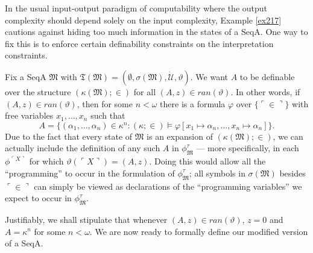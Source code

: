 \documentclass[12pt, twoside]{memoir}
\numberwithin{equation}{section}
\theoremstyle{definition}
\theoremstyle{remark}
\theoremstyle{definition}
\theoremstyle{definition}
\theoremstyle{definition}
\theoremstyle{remark}
\begin{document}
In the usual input-output paradigm of computability where the output complexity should depend solely on the input complexity, Example \ref{ex217} cautions against hiding too much information in the states of a SeqA. One way to fix this is to enforce certain definability constraints on the interpretation constraints. 

Fix a SeqA $\mathfrak{M}$ with $\mathfrak{T}(\mathfrak{M}) = (\emptyset, \sigma(\mathfrak{M}), \dot{\mathcal{U}}, \vartheta)$. We want $A$ to be definable over the structure $(\kappa(\mathfrak{M}); \in)$ for all $(A, z) \in ran(\vartheta)$. In other words, if $(A, z) \in ran(\vartheta)$, then for some $n < \omega$ there is a formula $\varphi$ over $\{\ulcorner \in \urcorner\}$ with free variables $x_1, \dots, x_n$ such that 
\begin{equation*}
    A = \{(\alpha_1, \dots, \alpha_n) \in \kappa^n : (\kappa; \in) \models \varphi[x_1 \mapsto \alpha_n, \dots, x_n \mapsto \alpha_n]\} \text{.}
\end{equation*}
Due to the fact that every state of $\mathfrak{M}$ is an expansion of $(\kappa(\mathfrak{M}); \in)$, we can actually include the definition of any such $A$ in $\phi^{\tau}_{\mathfrak{M}}$ --- more specifically, in each $\phi^{\ulcorner X \urcorner}$ for which $\vartheta(\ulcorner X \urcorner) = (A, z)$. Doing this would allow all the ``programming'' to occur in the formulation of $\phi^{\tau}_{\mathfrak{M}}$; all symbols in $\sigma(\mathfrak{M})$ besides $\ulcorner \in \urcorner$ can simply be viewed as declarations of the ``programming variables'' we expect to occur in $\phi^{\tau}_{\mathfrak{M}}$. 

Justifiably, we shall stipulate that whenever $(A, z) \in ran(\vartheta)$, $z = 0$ and $A = \kappa^n$ for some $n < \omega$. We are now ready to formally define our modified version of a SeqA.
\end{document}
